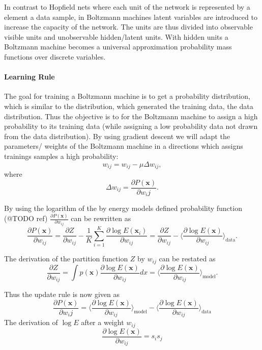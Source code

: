 In contrast to Hopfield nets where each unit of the network is represented by a element a data sample, in Boltzmann machines latent variables are introduced to increase the capacity of the network.
The units are thus divided into observable visible units and unobservable hidden/latent units.
With hidden units a Boltzmann machine becomes a universal approximation probability mass functions over discrete variables.


\paragraph{Learning Rule}

The goal for training a Boltzmann machine is to get a probability distribution, which is similar to the distribution, which generated the training data, the data distribution.
Thus the objective is to for the Boltzmann machine to assign a high probability to its training data (while assigning a low probability data not drawn from the data distribution).
By using gradient descent we will adapt the parameters/ weights of the Boltzmann machine in a directions which assigns trainings samples a high probability:
\[
w_{ij} = w_{ij} - \mu \Delta w_{ij},
\]
where
\[
\Delta w_{ij} = \frac{\partial P(\textbf{x})}{\partial w_ij}.
\]

By using the logarithm of the by energy models defined probability function (@TODO ref) $\frac{\partial P(\textbf{x})}{\partial w_{ij}}$ can be rewritten as
\[
\frac{\partial P(\textbf{x})}{\partial w_{ij}} = \frac{\partial Z}{\partial w_{ij}} - \frac{1}{K} \sum_{i=1}^K \frac{\partial \log E(\textbf{x}_i)}{\partial w_{ij}} =  \frac{\partial Z}{\partial w_{ij}} - \Big \langle \frac{\partial \log E(\textbf{x})}{\partial w_{ij}} \Big \rangle_{\text{data}}.
\]    

The derivation of the partition function $Z$ by $w_{ij}$ can be restated as
\[
 \frac{\partial Z}{\partial w_{ij}} = \int p(\textbf{x}) \frac{\partial \log E(\textbf{x})}{\partial w_{ij}} dx = \Big \langle \frac{\partial \log E(\textbf{x})}{\partial w_{ij}} \Big \rangle_{\text{model}}.
\]

Thus the update rule is now given as
\[
\frac{\partial P(\textbf{x})}{\partial w_ij} =  \Big \langle \frac{\partial \log E(\textbf{x})}{\partial w_{ij}} \Big \rangle_{\text{model}} - \Big \langle \frac{\partial \log E(\textbf{x})}{\partial w_{ij}} \Big \rangle_{\text{data}}
\]
The derivation of $\log E$ after a weight $w_{ij}$
\[
\frac{\partial \log E(\textbf{x})}{\partial w_{ij}} = s_i s_j
\]

